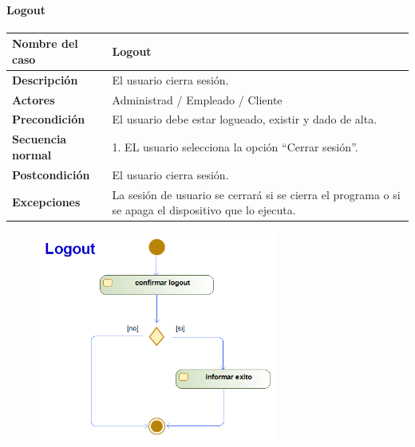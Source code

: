 \paragraph{Logout}
\begin{table}[H]
	\centering
	\small
	\begin{tabularx}{0.8\textwidth}{|p{3.5cm}|X|}
		\hline
		\rowcolor{lightgray}
		\textbf{Nombre del caso}  & \textbf{Logout}                                                                                       \\
		\hline
		\textbf{Descripción}      & El usuario cierra sesión.                                                                             \\
		\hline
		\textbf{Actores}          & Administrad / Empleado / Cliente                                                                      \\
		\hline
		\textbf{Precondición}     & El usuario debe estar logueado, existir y dado de alta.                                               \\
		\hline
		\textbf{Secuencia normal} & 1. EL usuario selecciona la opción ``Cerrar sesión''. \newline                                        \\
		\hline
		\textbf{Postcondición}    & El usuario cierra sesión.                                                                             \\
		\hline
		\textbf{Excepciones}      & La sesión de usuario se cerrará si se cierra el programa o si se apaga el dispositivo que lo ejecuta. \\
		\hline
	\end{tabularx}
\end{table}
\begin{figure}[H]
	\centering
	\includegraphics[width=0.7\textwidth]{Use_Cases/Logout.png}
\end{figure}
\newpage
